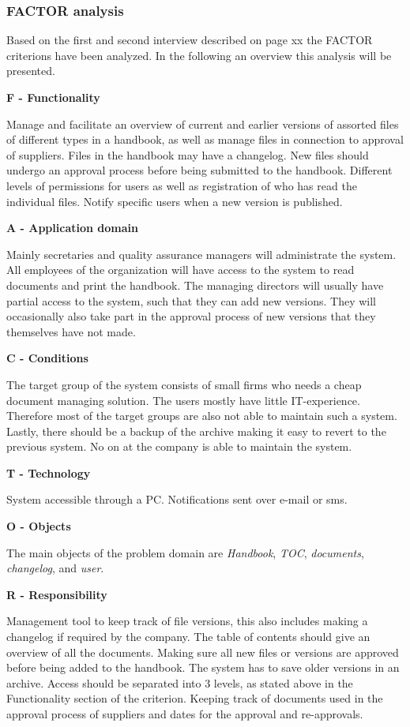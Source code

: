 \subsubsection{FACTOR analysis}
Based on the first and second interview described on {\color{red}page xx} the FACTOR criterions have been analyzed.
In the following an overview this analysis will be presented.

\textbf{F - Functionality}

Manage and facilitate an overview of current and earlier versions of assorted files of different types in a handbook, as well as manage files in connection to approval of suppliers.
Files in the handbook may have a changelog.
New files should undergo an approval process before being submitted to the handbook.
Different levels of permissions for users as well as registration of who has read the individual files.
Notify specific users when a new version is published.

\textbf{A - Application domain}

Mainly secretaries and quality assurance managers will administrate the system.
All employees of the organization will have access to the system to read documents and print the handbook.
The managing directors will usually have partial access to the system, such that they can add new versions.
They will occasionally also take part in the approval process of new versions that they themselves have not made.

\textbf{C - Conditions}

The target group of the system consists of small firms who needs a cheap document managing solution.
The users mostly have little IT-experience.
Therefore most of the target groups are also not able to maintain such a system.
Lastly, there should be a backup of the archive making it easy to revert to the previous system.
No on at the company is able to maintain the system.

\textbf{T - Technology}

System accessible through a PC.
Notifications sent over e-mail or sms.

\textbf{O - Objects}

The main objects of the problem domain are \textit{Handbook}, \textit{TOC}, \textit{documents}, \textit{changelog}, and \textit{user}.

\textbf{R  - Responsibility}

Management tool to keep track of file versions, this also includes making a changelog if required by the company.
The table of contents should give an overview of all the documents.
Making sure all new files or versions are approved before being added to the handbook.
The system has to save older versions in an archive.
Access should be separated into 3 levels, as stated above in the Functionality section of the criterion.
Keeping track of documents used in the approval process of suppliers and dates for the approval and re-approvals.

